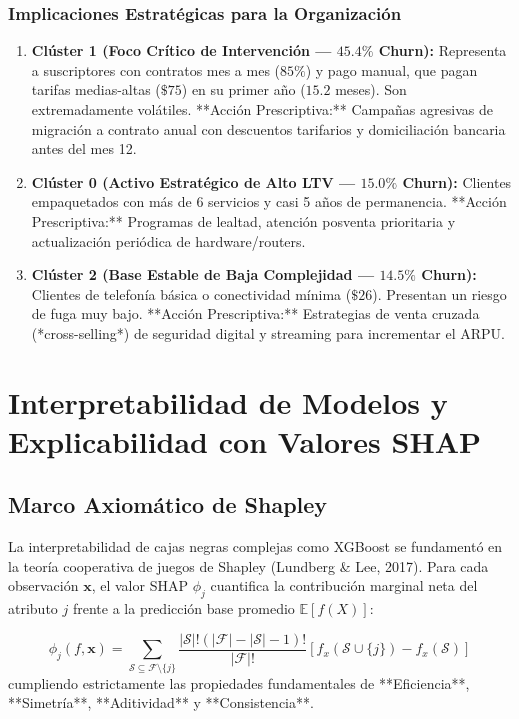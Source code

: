 \documentclass[11pt,letterpaper]{article}
\begin{document}
\subsubsection{Implicaciones Estratégicas para la Organización}
\begin{enumerate}
    \item \textbf{Clúster 1 (Foco Crítico de Intervención — $45.4\%$ Churn):} Representa a suscriptores con contratos mes a mes ($85\%$) y pago manual, que pagan tarifas medias-altas ($\$75$) en su primer año ($15.2$ meses). Son extremadamente volátiles. **Acción Prescriptiva:** Campañas agresivas de migración a contrato anual con descuentos tarifarios y domiciliación bancaria antes del mes 12.
    \item \textbf{Clúster 0 (Activo Estratégico de Alto LTV — $15.0\%$ Churn):} Clientes empaquetados con más de 6 servicios y casi 5 años de permanencia. **Acción Prescriptiva:** Programas de lealtad, atención posventa prioritaria y actualización periódica de hardware/routers.
    \item \textbf{Clúster 2 (Base Estable de Baja Complejidad — $14.5\%$ Churn):} Clientes de telefonía básica o conectividad mínima ($\$26$). Presentan un riesgo de fuga muy bajo. **Acción Prescriptiva:** Estrategias de venta cruzada (*cross-selling*) de seguridad digital y streaming para incrementar el ARPU.
\end{enumerate}

\section{Interpretabilidad de Modelos y Explicabilidad con Valores SHAP}

\subsection{Marco Axiomático de Shapley}
La interpretabilidad de cajas negras complejas como XGBoost se fundamentó en la teoría cooperativa de juegos de Shapley (Lundberg \& Lee, 2017). Para cada observación $\mathbf{x}$, el valor SHAP $\phi_j$ cuantifica la contribución marginal neta del atributo $j$ frente a la predicción base promedio $\mathbb{E}[f(X)]$:

\begin{equation}
    \phi_j(f, \mathbf{x}) = \sum_{\mathcal{S} \subseteq \mathcal{F} \setminus \{j\}} \frac{|\mathcal{S}|! (|\mathcal{F}| - |\mathcal{S}| - 1)!}{|\mathcal{F}|!} \left[ f_x(\mathcal{S} \cup \{j\}) - f_x(\mathcal{S}) \right]
\end{equation}
cumpliendo estrictamente las propiedades fundamentales de **Eficiencia**, **Simetría**, **Aditividad** y **Consistencia**.
\end{document}
